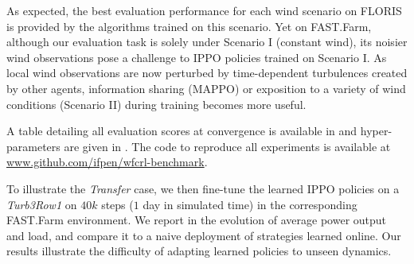 \documentclass{article}
\begin{document}
As expected, the best evaluation performance for each wind scenario on FLORIS is provided by the algorithms trained on this scenario. Yet on FAST.Farm, although our evaluation task is solely under Scenario I (constant wind), its noisier wind observations pose a challenge to IPPO policies trained on Scenario I. As local wind observations are now perturbed by time-dependent turbulences created by other agents, information sharing (MAPPO) or exposition to a variety of wind conditions (Scenario II) during training becomes more useful. 
%

A table detailing all evaluation scores at convergence is available in  and hyper-parameters are given in . The code to reproduce all experiments is available at \url{www.github.com/ifpen/wfcrl-benchmark}.

To illustrate the \textit{Transfer} case, we then fine-tune the learned IPPO policies on a \textit{Turb3Row1} on $40k$ steps ($1$ day in simulated time) in the corresponding FAST.Farm environment. We report in  the evolution of average power output and load, and compare it to a naive deployment of strategies learned online. Our results illustrate the difficulty of adapting learned policies to unseen dynamics.
 
%
% 
\end{document}
